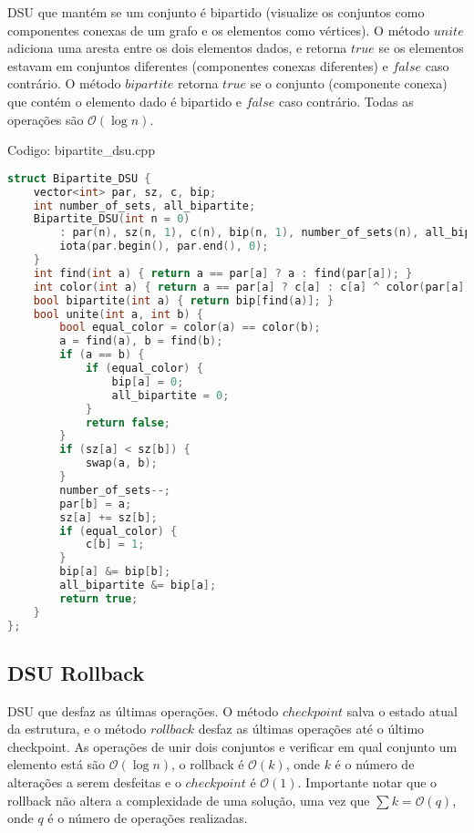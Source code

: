 \documentclass[10pt, a4paper, oneside]{book}
\begin{document}
DSU que mantém se um conjunto é bipartido (visualize os conjuntos como componentes conexas de um grafo e os elementos como vértices). O método $unite$ adiciona uma aresta entre os dois elementos dados, e retorna $true$ se os elementos estavam em conjuntos diferentes (componentes conexas diferentes) e $false$ caso contrário. O método $bipartite$ retorna $true$ se o conjunto (componente conexa) que contém o elemento dado é bipartido e $false$ caso contrário. Todas as operações são $\mathcal{O}(\log n)$.

\hfill

Codigo: bipartite\_dsu.cpp

\begin{lstlisting}[language=C++]
struct Bipartite_DSU {
    vector<int> par, sz, c, bip;
    int number_of_sets, all_bipartite;
    Bipartite_DSU(int n = 0)
        : par(n), sz(n, 1), c(n), bip(n, 1), number_of_sets(n), all_bipartite(1) {
        iota(par.begin(), par.end(), 0);
    }
    int find(int a) { return a == par[a] ? a : find(par[a]); }
    int color(int a) { return a == par[a] ? c[a] : c[a] ^ color(par[a]); }
    bool bipartite(int a) { return bip[find(a)]; }
    bool unite(int a, int b) {
        bool equal_color = color(a) == color(b);
        a = find(a), b = find(b);
        if (a == b) {
            if (equal_color) {
                bip[a] = 0;
                all_bipartite = 0;
            }
            return false;
        }
        if (sz[a] < sz[b]) {
            swap(a, b);
        }
        number_of_sets--;
        par[b] = a;
        sz[a] += sz[b];
        if (equal_color) {
            c[b] = 1;
        }
        bip[a] &= bip[b];
        all_bipartite &= bip[a];
        return true;
    }
};
\end{lstlisting}
\hfill

\subsection{DSU Rollback}


DSU que desfaz as últimas operações. O método $checkpoint$ salva o estado atual da estrutura, e o método $rollback$ desfaz as últimas operações até o último checkpoint. As operações de unir dois conjuntos e verificar em qual conjunto um elemento está são $\mathcal{O}(\log n)$, o rollback é $\mathcal{O}(k)$, onde $k$ é o número de alterações a serem desfeitas e o $checkpoint$ é $\mathcal{O}(1)$. Importante notar que o rollback não altera a complexidade de uma solução, uma vez que $\sum k = \mathcal{O}(q)$, onde $q$ é o número de operações realizadas.
\end{document}
